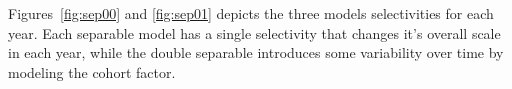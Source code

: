 \documentclass[a4paper,english,11pt]{article}
\begin{document}
\begin{knitrout}
\color{fgcolor}\begin{kframe}
\begin{alltt}
 \hlkwb{<-} \hlopt{~}  \hldef{=} \hldef{)} \hlopt{+}   \hldef{=} \hldef{)} \hlopt{+} \hldef{(} \hlopt{-}   \hldef{=} \hldef{)}
 \hlkwb{<-}     \hldef{=} \hldef{)}
\end{alltt}


{\ttfamily\noindent\bfseries{}}\end{kframe}
\end{knitrout}

Figures~\ref{fig:sep00} and \ref{fig:sep01} depicts the three models selectivities for each year. Each separable model has a single selectivity that changes it's overall scale in each year, while the double separable introduces some variability over time by modeling the cohort factor.
\end{document}
